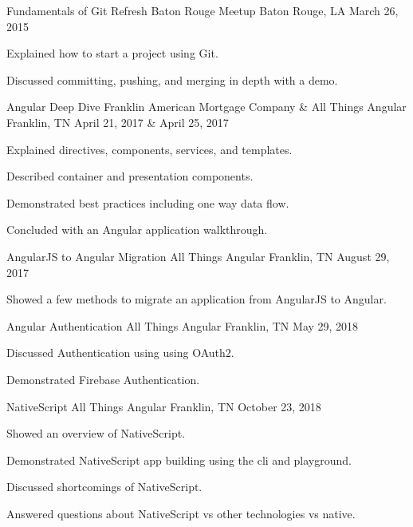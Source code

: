 \documentclass[letterpaper]{awesome-cv}
\begin{document}
\begin{cventries}
  \cventry
    {Fundamentals of Git}
    {Refresh Baton Rouge Meetup}
    {Baton Rouge, LA}
    {March 26, 2015}
    {
      \begin{cvitems}
        \item {Explained how to start a project using Git.}
        \item {Discussed committing, pushing, and merging in depth with a demo.}
      \end{cvitems}
    }

  \cventry
    {Angular Deep Dive}
    {Franklin American Mortgage Company \& All Things Angular}
    {Franklin, TN}
    {April 21, 2017 \& April 25, 2017}
    {
      \begin{cvitems}
        \item {Explained directives, components, services, and templates.}
        \item {Described container and presentation components.}
        \item {Demonstrated best practices including one way data flow.}
        \item {Concluded with an Angular application walkthrough.}
      \end{cvitems}
    }

  \cventry
    {AngularJS to Angular Migration}
    {All Things Angular}
    {Franklin, TN}
    {August 29, 2017}
    {
      \begin{cvitems}
        \item {Showed a few methods to migrate an application from AngularJS to Angular.}
      \end{cvitems}
    }

  \cventry
    {Angular Authentication}
    {All Things Angular}
    {Franklin, TN}
    {May 29, 2018}
    {
      \begin{cvitems}
        \item {Discussed Authentication using using OAuth2.}
        \item {Demonstrated Firebase Authentication.}
      \end{cvitems}
    }

  \cventry
    {NativeScript}
    {All Things Angular}
    {Franklin, TN}
    {October 23, 2018}
    {
      \begin{cvitems}
        \item {Showed an overview of NativeScript.}
        \item {Demonstrated NativeScript app building using the cli and playground.}
        \item {Discussed shortcomings of NativeScript.}
        \item {Answered questions about NativeScript vs other technologies vs native.}
      \end{cvitems}
    }
\end{cventries}
\end{document}
